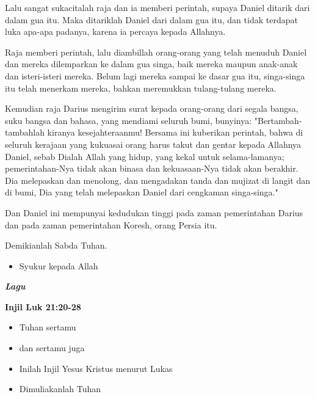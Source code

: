 \documentclass[a5paper,titlepage,10pt,openany]{scrbook}
\makeatletter
\newcommand{\subjudul}[1]{%
  {\parindent \z@ 
    \interlinepenalty\@M \bfseries #1\par\nobreak \vskip 10\p@ }}
\newcommand{\lagu}[1]{%
  {\parindent \z@ 
    \interlinepenalty\@M \slshape \bfseries \normalsize \textit{#1}\par\nobreak \vskip 10\p@ }}
\newcommand{\BU}[1]{\begin{itemize} \item[U:] #1 \end{itemize}}
\newcommand{\BI}[1]{\begin{itemize} \item[I:] #1 \end{itemize}}
\makeatother
\begin{document}
{Lalu sangat sukacitalah raja dan ia memberi perintah, supaya Daniel ditarik dari dalam gua itu. Maka ditariklah Daniel dari dalam gua itu, dan tidak terdapat luka apa-apa padanya, karena ia percaya kepada Allahnya.

Raja memberi perintah, lalu diambillah orang-orang yang telah menuduh Daniel dan mereka dilemparkan ke dalam gua singa, baik mereka maupun anak-anak dan isteri-isteri mereka. Belum lagi mereka sampai ke dasar gua itu, singa-singa itu telah menerkam mereka, bahkan meremukkan tulang-tulang mereka.

Kemudian raja Darius mengirim surat kepada orang-orang dari segala bangsa, suku bangsa dan bahasa, yang mendiami seluruh bumi, bunyinya: "Bertambah-tambahlah kiranya kesejahteraanmu!
Bersama ini kuberikan perintah, bahwa di seluruh kerajaan yang kukuasai orang harus takut dan gentar kepada Allahnya Daniel, sebab Dialah Allah yang hidup, yang kekal untuk selama-lamanya; pemerintahan-Nya tidak akan binasa dan kekuasaan-Nya tidak akan berakhir.
Dia melepaskan dan menolong, dan mengadakan tanda dan mujizat di langit dan di bumi, Dia yang telah melepaskan Daniel dari cengkaman singa-singa."

Dan Daniel ini mempunyai kedudukan tinggi pada zaman pemerintahan Darius dan pada zaman pemerintahan Koresh, orang Persia itu.

Demikianlah Sabda Tuhan.}

\BU{Syukur kepada Allah}

 

\lagu{Lagu}
 

\subjudul{Injil Luk 21:20-28}

\BI{Tuhan sertamu}

\BU{dan sertamu juga} 

\BI{Inilah Injil Yesus Kristus menurut Lukas}

\BU{Dimuliakanlah Tuhan}
\end{document}
